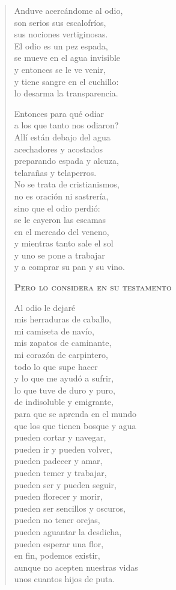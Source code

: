 \documentclass[12pt]{article}
\begin{document}
\begin{verse}
Anduve acercándome al odio,\\
son serios sus escalofríos,\\
sus nociones vertiginosas.\\
El odio es un pez espada,\\
se mueve en el agua invisible\\
y entonces se le ve venir,\\
y tiene sangre en el cuchillo:\\
lo desarma la transparencia.  

Entonces para qué odiar\\
a los que tanto nos odiaron?\\
Allí están debajo del agua\\
acechadores y acostados\\
preparando espada y alcuza,\\
telarañas y telaperros.\\
No se trata de cristianismos,\\
no es oración ni sastrería,\\
sino que el odio perdió:\\
se le cayeron las escamas\\
en el mercado del veneno,\\
y mientras tanto sale el sol\\
y uno se pone a trabajar\\
y a comprar su pan y su vino.  

{\bfseries\scshape {Pero lo considera en su testamento}}

Al odio le dejaré\\
mis herraduras de caballo,\\
mi camiseta de navío,\\
mis zapatos de caminante,\\
mi corazón de carpintero,\\
todo lo que supe hacer\\
y lo que me ayudó a sufrir,\\
lo que tuve de duro y puro,\\
de indisoluble y emigrante,\\
para que se aprenda en el mundo\\
que los que tienen bosque y agua\\
pueden cortar y navegar,\\
pueden ir y pueden volver,\\
pueden padecer y amar,\\
pueden temer y trabajar,\\
pueden ser y pueden seguir,\\
pueden florecer y morir,\\
pueden ser sencillos y oscuros,\\
pueden no tener orejas,\\
pueden aguantar la desdicha,\\
pueden esperar una flor,\\
en fin, podemos existir,\\
aunque no acepten nuestras vidas\\
unos cuantos hijos de puta.  


\end{verse}
\end{document}
